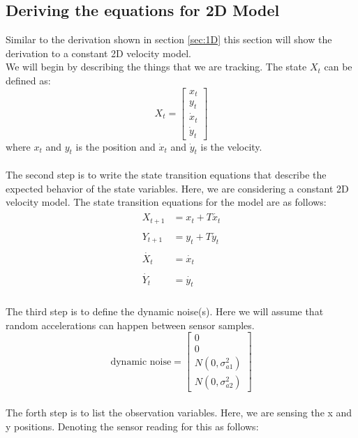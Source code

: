 \documentclass[12pt]{article}
\begin{document}
\subsection{Deriving the equations for 2D Model}
\label{sec:2D}
Similar to the derivation shown in section \ref{sec:1D} this section will show the derivation to a constant 2D velocity model. \\
We will begin by describing the things that we are tracking. The state $X_t$ can be defined as: 
\begin{equation}
X_t = 
\begin{bmatrix}
	x_t \\
	y_t \\
	\dot{x}_t\\
	\dot{y}_t
\end{bmatrix}
\label{eq:2d state}
\end{equation}
where $x_t$ and $y_t$ is the position and $\dot{x}_t$ and $\dot{y}_t$ is the velocity. \\
\\
The second step is to write the state transition equations that describe the expected behavior of the state variables. Here, we are considering a constant 2D velocity model. The state transition equations for the model are as follows: 
\begin{align}
\begin{split}
	X_{t+1} &= x_t + T \dot{x_t} \\
	\\
	Y_{t+1} &= y_t + T \dot{y_t} \\
	\\
	\dot{X_t} &=  \dot{x_t} \\
	\\
	\dot{Y_t} &=  \dot{y_t}
\end{split}
\label{eq:2d state transition}
\end{align}
\\
The third step is to define the dynamic noise(s). Here we will assume that random accelerations can happen between sensor samples. 
\begin{equation}
\text{dynamic noise} = 
\begin{bmatrix}
	0 \\
	0 \\
	N(0,\sigma^2_{a1}) \\
	N(0,\sigma^2_{a2})
\end{bmatrix}
\label{eq:2d dyn noise}
\end{equation}
\\
The forth step is to list the observation variables. Here, we are sensing the x and y positions. Denoting the sensor reading for this as follows: 
\end{document}

